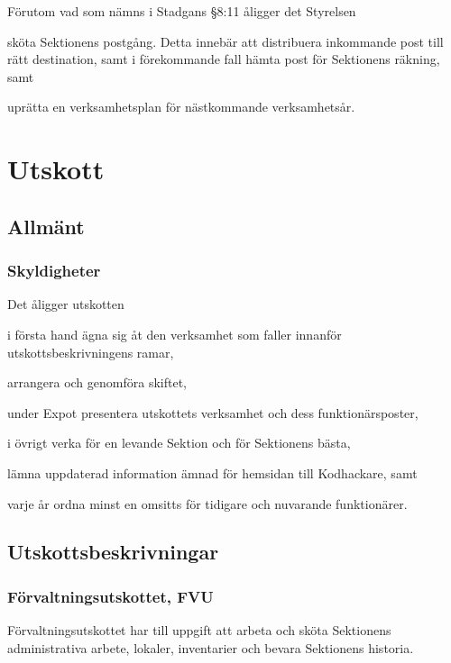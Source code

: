 \documentclass[10pt]{article}
\renewcommand{\thesubsection}{\arabic{section}:\Alph{subsection}}
\begin{document}
Förutom vad som nämns i Stadgans §8:11 åligger det Styrelsen
\begin{attlist}
    \item sköta Sektionens postgång. Detta innebär att distribuera inkommande
        post till rätt destination, samt i förekommande fall hämta post för
        Sektionens räkning, samt
    \item uprätta en verksamhetsplan för nästkommande verksamhetsår.
\end{attlist}

\renewcommand*\thesubsection{\arabic{section}:\arabic{subsection}}
\renewcommand*\thesubsubsection
{\arabic{section}:\arabic{subsection}:\Alph{subsubsection}}

\section{Utskott} %
\subsection{Allmänt}
\subsubsection{Skyldigheter}
Det åligger utskotten
\begin{attlist}
    \item i första hand ägna sig åt den verksamhet som faller innanför
        utskottsbeskrivningens ramar,
    \item arrangera och genomföra skiftet,
    \item under Expot presentera utskottets verksamhet och dess
        funktionärsposter,
    \item i övrigt verka för en levande Sektion och för Sektionens bästa,
    \item lämna uppdaterad information ämnad för hemsidan till Kodhackare, samt
    \item varje år ordna minst en omsitts för tidigare och nuvarande
        funktionärer.
\end{attlist}

\subsection{Utskottsbeskrivningar}
\subsubsection{Förvaltningsutskottet, FVU}
Förvaltningsutskottet har till uppgift att arbeta och sköta Sektionens administrativa arbete, lokaler, inventarier och bevara Sektionens historia.
\end{document}
